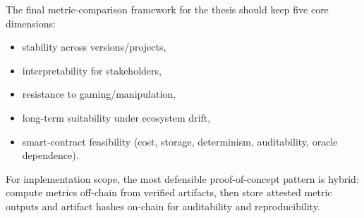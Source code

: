\documentclass[11pt,a4paper]{article}
\begin{document}
The final metric-comparison framework for the thesis should keep five core dimensions:
\begin{itemize}[leftmargin=*]
  \item stability across versions/projects,
  \item interpretability for stakeholders,
  \item resistance to gaming/manipulation,
  \item long-term suitability under ecosystem drift,
  \item smart-contract feasibility (cost, storage, determinism, auditability, oracle dependence).
\end{itemize}

For implementation scope, the most defensible proof-of-concept pattern is hybrid: compute metrics off-chain from verified artifacts, then store attested metric outputs and artifact hashes on-chain for auditability and reproducibility.
\end{document}

